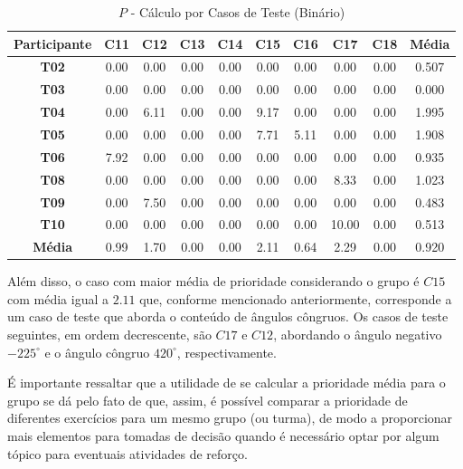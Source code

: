 \begin{table}[htbp]
	\centering
	\caption{$P$ - Cálculo por Casos de Teste (Binário)}
	\begin{tabular}{|c|c|c|c|c|c|c|c|c|c|}
		\hline
		\rowcolor[HTML]{D9D9D9} 
		\cellcolor[HTML]{D0CECE}\textbf{Participante} & \textbf{C11} & \textbf{C12} & \textbf{C13} & \textbf{C14} & \textbf{C15} & \textbf{C16} & \textbf{C17} & \textbf{C18} & \textbf{Média} \\ \hline
		\textbf{T02} & 0.00 & 0.00 & 0.00 & 0.00 & 0.00 & 0.00 & 0.00 & 0.00 & 0.507 \\ \hline
		\rowcolor[HTML]{F2F2F2} 
		\textbf{T03} & 0.00 & 0.00 & 0.00 & 0.00 & 0.00 & 0.00 & 0.00 & 0.00 & 0.000 \\ \hline
		\textbf{T04} & 0.00 & 6.11 & 0.00 & 0.00 & 9.17 & 0.00 & 0.00 & 0.00 & 1.995 \\ \hline
		\rowcolor[HTML]{F2F2F2} 
		\textbf{T05} & 0.00 & 0.00 & 0.00 & 0.00 & 7.71 & 5.11 & 0.00 & 0.00 & 1.908 \\ \hline
		\textbf{T06} & 7.92 & 0.00 & 0.00 & 0.00 & 0.00 & 0.00 & 0.00 & 0.00 & 0.935 \\ \hline
		\rowcolor[HTML]{F2F2F2} 
		\textbf{T08} & 0.00 & 0.00 & 0.00 & 0.00 & 0.00 & 0.00 & 8.33 & 0.00 & 1.023 \\ \hline
		\textbf{T09} & 0.00 & 7.50 & 0.00 & 0.00 & 0.00 & 0.00 & 0.00 & 0.00 & 0.483 \\ \hline
		\rowcolor[HTML]{F2F2F2} 
		\textbf{T10} & 0.00 & 0.00 & 0.00 & 0.00 & 0.00 & 0.00 & 10.00 & 0.00 & 0.513 \\ \hline
		\rowcolor[HTML]{D0CECE} 
		\textbf{Média} & 0.99 & 1.70 & 0.00 & 0.00 & 2.11 & 0.64 & 2.29 & 0.00 & 0.920 \\ \hline
	\end{tabular}
	\label{tab:F3_A2_P_CASOS_BINARIO_}
\end{table}

Além disso, o caso com maior média de prioridade considerando o grupo é $C15$ com média igual a $2.11$ que, conforme mencionado anteriormente, corresponde a um caso de teste que aborda o conteúdo de ângulos côngruos. Os casos de teste seguintes, em ordem decrescente, são $C17$ e $C12$, abordando o ângulo negativo $-225^{\circ}$ e o ângulo côngruo $420^{\circ}$, respectivamente.

É importante ressaltar que a utilidade de se calcular a prioridade média para o grupo se dá pelo fato de que, assim, é possível comparar a prioridade de diferentes exercícios para um mesmo grupo (ou turma), de modo a proporcionar mais elementos para tomadas de decisão quando é necessário optar por algum tópico para eventuais atividades de reforço.

